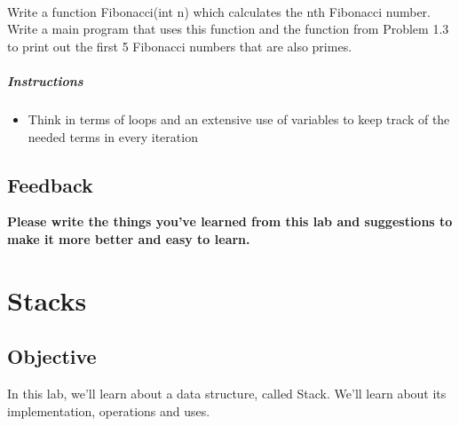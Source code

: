 \documentclass[11pt,fleqn]{book} %
\begin{document}
~\\
\begin{problem}
	Write a function Fibonacci(int n) which calculates the nth Fibonacci number. Write a main program that uses this function and the function from Problem 1.3 to print out the first 5 Fibonacci numbers that are also primes.
	\paragraph{Instructions}
	\begin{itemize}
		\item Think in terms of loops and an extensive use of variables to keep track of the needed terms in every iteration
	\end{itemize}
\end{problem}
\newpage
\section{Feedback}
\textbf{Please write the things you've learned from this lab and suggestions to make it more better and easy to learn.}

\chapter{Stacks}
\section{Objective}
In this lab, we'll learn about a data structure, called Stack. We'll learn about its implementation, operations and uses.
\end{document}
